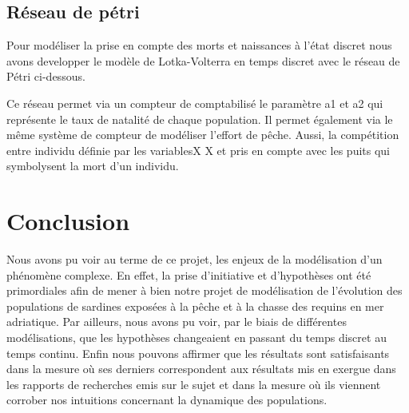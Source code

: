 \documentclass[a4paper, 11pt]{report}%
\begin{document}
        \subsection{Réseau de pétri}
        Pour modéliser la prise en compte des morts et naissances à l'état discret nous avons developper
        le modèle de Lotka-Volterra en temps discret avec le réseau de Pétri ci-dessous. 



        Ce réseau permet via un compteur de comptabilisé le paramètre a1 et a2 qui représente le taux de
        natalité de chaque population. Il permet également via le même système de compteur de modéliser 
        l'effort de pêche. Aussi, la compétition entre individu définie par les variablesX X  et pris en
        compte avec les puits qui symbolysent la mort d'un individu. 
    \section{Conclusion}
    Nous avons pu voir au terme de ce projet, les enjeux de la modélisation d'un phénomène complexe. En effet, 
    la prise d'initiative et d'hypothèses ont été primordiales afin de mener à bien notre projet de modélisation 
    de l'évolution des populations de sardines exposées à la pêche et à la chasse des requins en mer adriatique. 
    Par ailleurs, nous avons pu voir, par le biais de différentes modélisations, que les hypothèses changeaient
    en passant du temps discret au temps continu. Enfin nous pouvons affirmer que les résultats sont satisfaisants
    dans la mesure où ses derniers correspondent aux résultats mis en exergue dans les rapports de recherches emis 
    sur le sujet et dans la mesure où ils viennent corrober nos intuitions concernant la dynamique des populations.
    \nocite{*}
    
\end{document}
